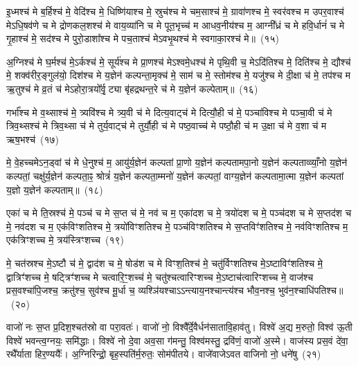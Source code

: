 इ॒ध्मश्च॑ मे ब॒र्\mbox{}हिश्च॑ मे॒ वेदि॑श्च मे॒ धिष्णि॑याश्च मे॒ स्रुच॑श्च मे चम॒साश्च॑ मे॒ ग्रावा॑णश्च मे॒ स्वर॑वश्च म उपर॒वाश्च॑ मे\-ऽधि॒षव॑णे च मे द्रोणकल॒शश्च॑ मे वाय॒व्या॑नि च मे पूत॒भृच्च॑ म आधव॒नीय॑श्च म॒ आग्नी᳚ध्रं च मे हवि॒र्धानं॑ च मे गृ॒हाश्च॑ मे॒ सद॑श्च मे पुरो॒डाशा᳚श्च मे पच॒ताश्च॑ मे\-ऽवभृ॒थश्च॑ मे स्वगाका॒रश्च॑ मे॥~(१५)

{\anuvakamend[{गृ॒हाश्च॒ षोड॑श च}]}%

अ॒ग्निश्च॑ मे घ॒र्मश्च॑ मे॒\-ऽर्कश्च॑ मे॒ सूर्य॑श्च मे प्रा॒णश्च॑ मे\-ऽश्वमे॒धश्च॑ मे पृथि॒वी च॒ मे\-ऽदि॑तिश्च मे॒ दिति॑श्च मे॒ द्यौश्च॑ मे॒ शक्व॑रीर॒ङ्गुल॑यो॒ दिश॑श्च मे य॒ज्ञेन॑ कल्पन्ता॒मृक्च॑ मे॒ साम॑ च मे॒ स्तोम॑श्च मे॒ यजु॑श्च मे दी॒क्षा च॑ मे॒ तप॑श्च म ऋ॒तुश्च॑ मे व्र॒तं च॑ मे\-ऽहोरा॒त्रयो᳚र्वृ॒ट्या बृ॑हद्रथन्त॒रे च॑ मे य॒ज्ञेन॑ कल्पेताम्॥~(१६)

{\anuvakamend[{दी॒क्षा\-ऽष्टाद॑श च}]}%

गर्भा᳚श्च मे व॒थ्साश्च॑ मे॒ त्र्यवि॑श्च मे त्र्य॒वी च॑ मे दित्य॒वाट्च॑ मे दित्यौ॒ही च॑ मे॒ पञ्चा॑विश्च मे पञ्चा॒वी च॑ मे त्रिव॒थ्सश्च॑ मे त्रिव॒थ्सा च॑ मे तुर्य॒वाट्च॑ मे तुर्यौ॒ही च॑ मे पष्ठ॒वाच्च॑ मे पष्ठौ॒ही च॑ म उ॒क्षा च॑ मे व॒शा च॑ म ऋष॒भश्च॑~(१७)

मे॒ वे॒हच्चमे\-ऽन॒ड्वां च॑ मे धे॒नुश्च॑ म॒ आयु॑र्य॒ज्ञेन॑ कल्पतां प्रा॒णो य॒ज्ञेन॑ कल्पतामपा॒नो य॒ज्ञेन॑ कल्पताव्व्याँ॒नो य॒ज्ञेन॑ कल्पतां॒ चक्षु॑र्य॒ज्ञेन॑ कल्पता॒ꣴ॒ श्रोत्रं॑ य॒ज्ञेन॑ कल्पता॒म्मनो॑ य॒ज्ञेन॑ कल्पतां॒ वाग्य॒ज्ञेन॑ कल्पतामा॒त्मा य॒ज्ञेन॑ कल्पतां य॒ज्ञो य॒ज्ञेन॑ कल्पताम्॥~(१८)

{\anuvakamend[{ऋ॒ष॒भश्च॑ चत्वारि॒ꣳ॒शच्च॑}]}%

एका॑ च मे ति॒स्रश्च॑ मे॒ पञ्च॑ च मे स॒प्त च॑ मे॒ नव॑ च म॒ एका॑\-दश च मे॒ त्रयो॑दश च मे॒ पञ्च॑दश च मे स॒प्तद॑श च मे॒ नव॑दश च म॒ एक॑विꣳशतिश्च मे॒ त्रयो॑विꣳशतिश्च मे॒ पञ्च॑विꣳशतिश्च मे स॒प्तविꣳ॑शतिश्च मे॒ नव॑विꣳशतिश्च म॒ एक॑त्रिꣳशच्च मे॒ त्रय॑स्त्रिꣳशच्च~(१९)

मे॒ चत॑स्रश्च मे॒\-ऽष्टौ च॑ मे॒ द्वाद॑श च मे॒ षोड॑श च मे विꣳश॒तिश्च॑ मे॒ चतु॑र्विꣳशतिश्च मे॒\-ऽष्टाविꣳ॑शतिश्च मे॒ द्वात्रिꣳ॑शच्च मे॒ षट्त्रिꣳ॑शच्च मे चत्वारि॒ꣳ॒शच्च॑ मे॒ चतु॑श्चत्वारिꣳशच्च मे॒\-ऽष्टाच॑त्वारिꣳशच्च मे॒ वाज॑श्च प्रस॒वश्चा॑पि॒जश्च॒ क्रतु॑श्च॒ सुव॑श्च मू॒र्धा च॒ व्यश्ञि॑यश्चाऽऽन्त्याय॒नश्चान्त्य॑श्च भौव॒नश्च॒ भुव॑न॒श्चाधि॑पतिश्च॥~(२०)

{\anuvakamend[{त्रय॑स्त्रिꣳशच्च॒ व्यश्ञि॑य॒ एका॑\-दश च}]}%

वाजो॑ नः स॒प्त प्र॒दिश॒श्चत॑स्रो वा परा॒वतः॑। वाजो॑ नो॒ विश्वै᳚र्दे॒वैर्धन॑सातावि॒हाव॑तु। विश्वे॑ अ॒द्य म॒रुतो॒ विश्व॑ ऊ॒ती विश्वे॑ भवन्त्व॒ग्नयः॒ समि॑द्धाः। विश्वे॑ नो दे॒वा अव॒सा ग॑मन्तु॒ विश्व॑मस्तु॒ द्रवि॑णं॒ वाजो॑ अ॒स्मे। वाज॑स्य प्रस॒वं दे॑वा॒ रथै᳚र्याता हिर॒ण्ययैः᳚। अ॒ग्निरिन्द्रो॒ बृह॒स्पति॑र्म॒रुतः॒ सोम॑पीतये। वाजे॑वाजे\-ऽवत वाजिनो नो॒ धने॑षु~(२१)

